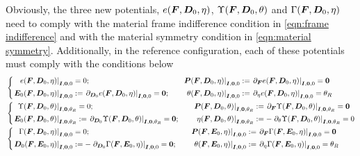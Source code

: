 Obviously, the three new potentials, $e(\boldsymbol{F},\boldsymbol{D}_0,\eta)$, $\Upsilon(\boldsymbol{F},\boldsymbol{D}_0,\theta)$ and $\Gamma(\boldsymbol{F},\boldsymbol{D}_0,\eta)$ need to comply with the 
material frame indifference condition in \eqref{eqn:frame indifference} and with the material symmetry condition in \eqref{eqn:material symmetry}. Additionally, in the reference configuration, each of these potentials must comply with the conditions below
%
\begin{equation}\label{eqn:reference conditions for the different potentials}
\begin{aligned}
&\left\{\begin{aligned}	
\left.e(\vect{F},\vect{D}_0,\eta)\right\vert_{\vect{I},\vect{0},0}&=0; &\quad \left.{\vect{P}}(\vect{F},\vect{D}_0,\eta)\right\vert_{\vect{I},\vect{0},0}&:=\left.\partial_{\vect{F}}e(\vect{F},\vect{D}_0,\eta)\right\vert_{\vect{I},\vect{0},0}=\vect{0}\\
%
\left.{\vect{E}_0}(\vect{F},\vect{D}_0,\eta)\right\vert_{\vect{I},\vect{0},0}&:=\left.\partial_{\vect{D}_0}e(\vect{F},\vect{D}_0,\eta)\right\vert_{\vect{I},\vect{0},0}=\vect{0}; &\quad \left.\theta(\vect{F},\vect{D}_0,\eta)\right\vert_{\vect{I},\vect{0},0}&:=\left.\partial_{\eta}e(\vect{F},\vect{D}_0,\eta)\right\vert_{\vect{I},\vect{0},0}=\theta_R
\end{aligned}	\right.\\
%
%
&\left\{\begin{aligned}	
\left.\Upsilon(\vect{F},\vect{D}_0,\theta)\right\vert_{\vect{I},\vect{0},\theta_R}&=0; &\quad \left.{\vect{P}}(\vect{F},\vect{D}_0,\theta)\right\vert_{\vect{I},\vect{0},\theta_R}&:=\left.\partial_{\vect{F}}\Upsilon(\vect{F},\vect{D}_0,\theta)\right\vert_{\vect{I},\vect{0},\theta_R}=\vect{0}\\
%
\left.{\vect{E}_0}(\vect{F},\vect{D}_0,\theta)\right\vert_{\vect{I},\vect{0},\theta_R}&:=\left.\partial_{\vect{D}_0}\Upsilon(\vect{F},\vect{D}_0,\theta)\right\vert_{\vect{I},\vect{0},\theta_R}=\vect{0}; &\quad \left.\eta(\vect{F},\vect{D}_0,\theta)\right\vert_{\vect{I},\vect{0},\theta_R}&:=-\left.\partial_{\theta}\Upsilon(\vect{F},\vect{D}_0,\theta)\right\vert_{\vect{I},\vect{0},\theta_R}={0}
\end{aligned}	\right.\\
%
%
&\left\{\begin{aligned}	
\left.\Gamma(\vect{F},\vect{D}_0,\eta)\right\vert_{\vect{I},\vect{0},0}&=0; &\quad \left.{\vect{P}}(\vect{F},\vect{E}_0,\eta)\right\vert_{\vect{I},\vect{0},0}&:=\left.\partial_{\vect{F}}\Gamma(\vect{F},\vect{E}_0,\eta)\right\vert_{\vect{I},\vect{0},0}=\vect{0}\\
%
\left.{\vect{D}_0}(\vect{F},\vect{E}_0,\eta)\right\vert_{\vect{I},\vect{0},0}&:=-\left.\partial_{\vect{D}_0}\Gamma(\vect{F},\vect{E}_0,\eta)\right\vert_{\vect{I},\vect{0},0}=\vect{0}; &\quad \left.\theta(\vect{F},\vect{E}_0,\eta)\right\vert_{\vect{I},\vect{0},0}&:=\left.\partial_{\eta}\Gamma(\vect{F},\vect{E}_0,\eta)\right\vert_{\vect{I},\vect{0},0}=\theta_R
\end{aligned}	\right.\\
%
%
\end{aligned}
\end{equation}



